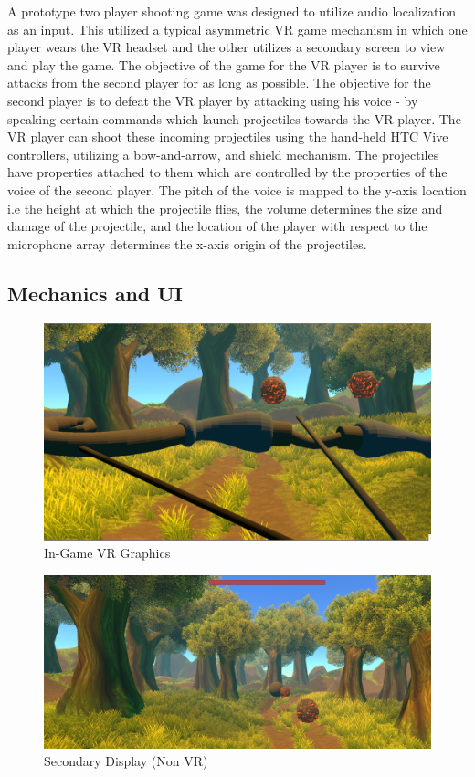 \documentclass[convention]{aesconf}
\begin{document}
A prototype two player shooting game was designed to utilize audio localization as an input. This utilized a typical asymmetric VR game mechanism in which one player wears the VR headset and the other utilizes a secondary screen to view and play the game. The objective of the game for the VR player is to survive attacks from the second player for as long as possible. The objective for the second player is to defeat the VR player by attacking using his voice - by speaking certain commands which launch projectiles towards the VR player. The VR player can shoot these incoming projectiles using the hand-held HTC Vive controllers, utilizing a bow-and-arrow, and shield mechanism. The projectiles have properties attached to them which are controlled by the properties of the voice of the second player. The pitch of the voice is mapped to the y-axis location i.e the height at which the projectile flies, the volume determines the size and damage of the projectile, and the location of the player with respect to the microphone array determines the x-axis origin of the projectiles.

\subsection{Mechanics and UI}

\begin{figure}[ht!]
\includegraphics[width=\linewidth]{1}
\caption{In-Game VR Graphics}
\label{auravr} %
\end{figure}


\begin{figure}[ht!]
\includegraphics[width=\linewidth]{3}
\caption{Secondary Display (Non VR)}
\label{auravr2} %
\end{figure}
\end{document}

